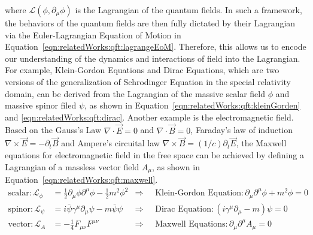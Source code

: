 \noindent where $\mathcal{L}(\phi, \partial_\mu \phi)$ is the Lagrangian of the quantum fields. In such a framework, the behaviors of the quantum fields are then fully dictated by their Lagrangian via the Euler-Lagrangian Equation of Motion in Equation~\ref{eqn:relatedWorks:qft:lagrangeEoM}. Therefore, this allows us to encode our understanding of the dynamics and interactions of field into the Lagrangian. For example, Klein-Gordon Equations and Dirac Equations, which are two versions of the generalization of Schrodinger Equation in the special relativity domain, can be derived from the Lagrangian of the massive scalar field $\phi$ and massive spinor filed $\psi$, as shown in Equation~\ref{eqn:relatedWorks:qft:kleinGorden} and \ref{eqn:relatedWorks:qft:dirac}. Another example is the electromagnetic field. Based on the Gauss's Law $\nabla \cdot \vec{E} = 0$ and $\nabla \cdot \vec{B} = 0$, Faraday's law of induction $\nabla \times \vec{E} = - \partial_t \vec{B}$ and Ampere's circuital law $\nabla \times \vec{B} = (1/c) \partial_t \vec{E}$, the Maxwell equations for electromagnetic field in the free space can be achieved by defining a Lagrangian of a massless vector field $A_\mu$, as shown in Equation~\ref{eqn:relatedWorks:qft:maxwell}.
\begin{align}
    \text{scalar:} \,
    \mathcal{L}_\phi &= \frac{1}{2} \partial_\mu\phi \partial^\mu \phi - \frac{1}{2} m^2 \phi^2 
        &\Longrightarrow& \;  \text{ Klein-Gordon Equation:} \, \partial_\mu \partial^\mu \phi + m^2 \phi = 0 \label{eqn:relatedWorks:qft:kleinGorden}\\
    \text{spinor:} \,
    \mathcal{L}_\psi &= i \bar{\psi}\gamma^\mu \partial_\mu \psi - m \bar{\psi} \psi 
        &\Longrightarrow& \; \text{ Dirac Equation:}  \, (i\gamma^\mu\partial_\mu - m) \psi = 0 \label{eqn:relatedWorks:qft:dirac} \\
    \text{vector:} \,
    \mathcal{L}_A &= -\frac{1}{4}F_{\mu\nu} F^{\mu \nu} 
        &\Longrightarrow& \; \text{ Maxwell Equations:} \, \partial_\mu \partial^\mu A_\mu = 0 \label{eqn:relatedWorks:qft:maxwell}
\end{align}


